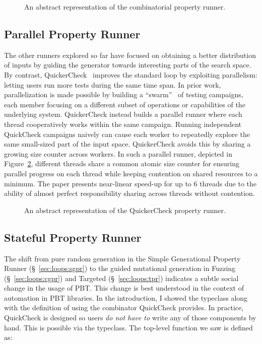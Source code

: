 \begin{figure}[t]
  \centering
  \resizebox{0.95\linewidth}{!}{}
  \caption{An abstract representation of the combinatorial property runner.}
  \label{fig:combinatorial-property-runner}
\end{figure}

\subsection{Parallel Property Runner}\label{sec:loops:ppr}

The other runners explored so far have focused on obtaining a better distribution of
inputs by guiding the generator towards interesting parts of the search space. By
contrast, QuickerCheck~\cite{ParallelTesting} improves the standard loop by exploiting
parallelism: letting users run more tests during the same time span.
%
In prior work, parallelization is made possible by building a
``swarm''~\cite{swarm-testing} of testing campaigns, each member focusing on a
different subset of operations or capabilities of the underlying system. QuickerCheck
instead builds a parallel runner where each thread cooperatively works within the same
campaign. Running independent QuickCheck campaigns naively can cause each worker to
repeatedly explore the same small-sized part of the input space. QuickerCheck avoids
this by sharing a growing size counter across workers.
%
In such a parallel runner, depicted in Figure~\ref{fig:parallel-property-runner},
different threads share a common atomic size counter for ensuring parallel progress on
each thread while keeping contention on shared resources to a minimum. The paper
presents near-linear speed-up for up to 6 threads due to the ability of almost perfect
responsibility sharing across threads without contention.

\begin{figure}[h!]
  \centering
  \resizebox{0.95\linewidth}{!}{}
  \caption{An abstract representation of the QuickerCheck property runner.}
  \label{fig:parallel-property-runner}
\end{figure}

\subsection{Stateful Property Runner}\label{sec:loops:spr}

The shift from pure random generation in the Simple Generational Property Runner
(\S~\ref{sec:loops:sgpr}) to the guided mutational generation in Fuzzing
(\S~\ref{sec:loops:cgpr}) and Targeted (\S~\ref{sec:loops:tpr}) indicates a subtle
social change in the usage of PBT. This change is best understood in the context of
automation in PBT libraries.
%
In the introduction, I showed the  typeclass along with the definition
of  using the  combinator QuickCheck provides. In
practice, QuickCheck is designed so users \emph{do not have to} write any of those
components by hand. This is possible via the  typeclass. The top-level
 function we saw is defined as:

